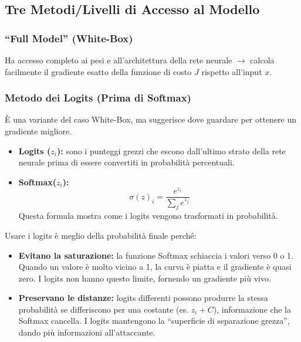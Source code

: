 \subsection{Tre Metodi/Livelli di Accesso al Modello}

\subsubsection{``Full Model'' (White-Box)}

Ha accesso completo ai pesi e all'architettura della rete
neurale $\rightarrow$ calcola facilmente il gradiente esatto
della funzione di costo $J$ rispetto all'input $x$.

\subsubsection{Metodo dei Logits (Prima di Softmax)}

È una variante del caso White-Box, ma suggerisce dove guardare
per ottenere un gradiente migliore.

\begin{itemize}
    \item \textbf{Logits ($z_i$):} sono i punteggi grezzi che
          escono dall'ultimo strato della rete neurale prima di
          essere convertiti in probabilità percentuali.
    \item \textbf{Softmax($z_i$):}
          \[
              \sigma(z)_i =
              \frac{e^{z_i}}{\sum_j e^{z_j}}
          \]
          Questa formula mostra come i logits vengono
          trasformati in probabilità.
\end{itemize}

Usare i logits è meglio della probabilità finale perché:
\begin{itemize}
    \item \textbf{Evitano la saturazione:} la funzione Softmax
          schiaccia i valori verso 0 o 1. Quando un valore è
          molto vicino a 1, la curva è piatta e il gradiente è
          quasi zero. I logits non hanno questo limite,
          fornendo un gradiente più vivo.
    \item \textbf{Preservano le distanze:} logits differenti
          possono produrre la stessa probabilità se differiscono
          per una costante (es. $z_i + C$), informazione che la
          Softmax cancella. I logits mantengono la ``superficie
          di separazione grezza'', dando più informazioni
          all'attaccante.
\end{itemize}

